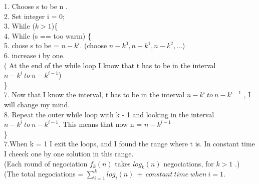 \documentclass[11 pt]{article}
\begin{document}
1. Choose s to be n . \\
2. Set integer i = 0;\\
3. While ($k > 1$)\{\\
4. While (s ==  too warm) 
  \{\\
  5. chose s to be =   $n - k^i $.   (choose  $n- k^0,  n - k^1, n-k^2, ...$)\\
  6.  increase i by one.  \\
 ( At the end of the while loop I know that t has to be in the interval $ n - k^i \  to \  n- k^{i-1}$)\\
\}\\
7. Now that I know the interval, t has  to be in the interval $n-k^i \ to \ n-k^{i-1}$ , I will change my mind. \\
8. Repeat the outer while loop with k - 1 and looking in the interval $ n-k^i \ to \ n-k^{i-1}$. This means that now n = $n-k^{i-1}$\\
\}\\
7.When k = 1 I exit the loops,  and  I  found the range where t is. In  constant time I cheeck one by one solution in this range. \\
(Each round of negociation $f_k(n)$  takes $log_k(n)$ negociations, for $k > 1$ .)\\
(The total negociations = $\sum_{i=1}^{k}  log_i (n)  \ + \ constant \ time \ when\  i = 1.$
\end{document}
